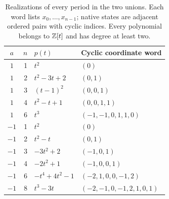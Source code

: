 \begin{table}[tb]
\centering
\caption{Realizations of every period in the two unions. Each word
lists $x_0,\ldots,x_{n-1}$; native states are adjacent ordered
pairs with cyclic indices. Every polynomial belongs to $\mathbb Z[t]$
and has degree at least two.}
\label{tab:witnesses}
\small
\begin{tabular}{@{}crll@{}}
\toprule
$a$ & $n$ & $p(t)$ & Cyclic coordinate word\\
\midrule
$1$ & 1 & $t^2$ & $(0)$\\
$1$ & 2 & $t^2-3t+2$ & $(0,1)$\\
$1$ & 3 & $(t-1)^2$ & $(0,0,1)$\\
$1$ & 4 & $t^2-t+1$ & $(0,0,1,1)$\\
$1$ & 6 & $t^3$ & $(-1,-1,0,1,1,0)$\\
\midrule
$-1$ & 1 & $t^2$ & $(0)$\\
$-1$ & 2 & $t^2-t$ & $(0,1)$\\
$-1$ & 3 & $-3t^2+2$ & $(-1,0,1)$\\
$-1$ & 4 & $-2t^2+1$ & $(-1,0,0,1)$\\
$-1$ & 6 & $-t^4+4t^2-1$ & $(-2,1,0,0,-1,2)$\\
$-1$ & 8 & $t^3-3t$ & $(-2,-1,0,-1,2,1,0,1)$\\
\bottomrule
\end{tabular}
\end{table}
